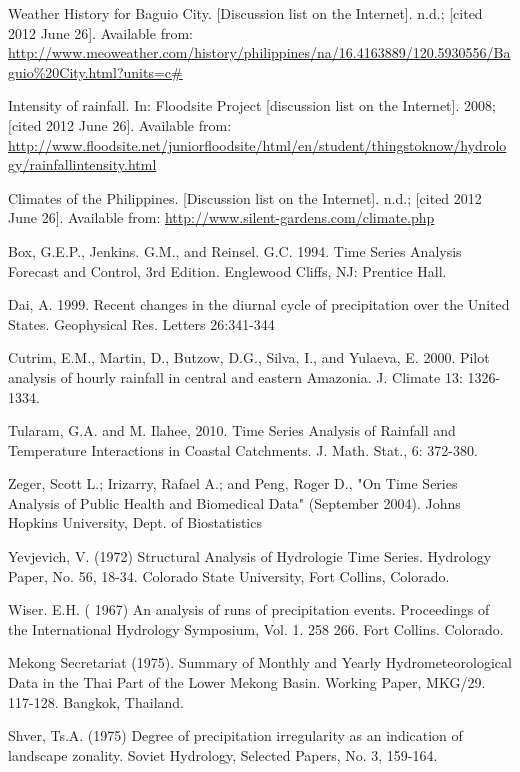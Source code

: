 \documentclass{pshscarc}\usepackage{graphicx, color}
\begin{document}
\begin{thebibliography}{99\kern\bibindent}
 Weather History for Baguio City. [Discussion list on the Internet]. n.d.; [cited 2012 June 26]. Available from: \url{http://www.meoweather.com/history/philippines/na/16.4163889/120.5930556/Baguio%20City.html?units=c#}

 Intensity of rainfall. In: Floodsite Project [discussion list on the Internet]. 2008; [cited 2012 June 26]. Available from: \url{http://www.floodsite.net/juniorfloodsite/html/en/student/thingstoknow/hydrology/rainfallintensity.html}

 Climates of the Philippines. [Discussion list on the Internet]. n.d.; [cited 2012 June 26]. Available from: \url{http://www.silent-gardens.com/climate.php}

 Box, G.E.P.,  Jenkins. G.M., and Reinsel. G.C.  1994. Time Series Analysis Forecast and Control, 3rd Edition. Englewood Cliffs, NJ: Prentice Hall.

 Dai, A. 1999. Recent changes in the diurnal cycle of precipitation over the United States. Geophysical Res. Letters 26:341-344

 Cutrim,  E.M., Martin, D., Butzow, D.G., Silva, I., and Yulaeva, E. 2000. Pilot analysis of hourly rainfall in central and eastern Amazonia. J. Climate 13: 1326-1334.

 Tularam, G.A. and M. Ilahee, 2010. Time Series Analysis of Rainfall and Temperature Interactions in Coastal Catchments. J. Math. Stat., 6: 372-380.

Zeger, Scott L.; Irizarry, Rafael A.; and Peng, Roger D., "On Time Series Analysis of Public Health and Biomedical Data" (September 2004). Johns Hopkins University, Dept. of Biostatistics 

Yevjevich, V. (1972) Structural Analysis of Hydrologie Time Series. Hydrology Paper, No. 56, 18-34. Colorado State University, Fort Collins, Colorado.

Wiser. E.H. ( 1967) An analysis of runs of precipitation events. Proceedings of the International Hydrology Symposium, Vol. 1. 258 266. Fort Collins. Colorado.

Mekong Secretariat (1975). Summary of Monthly and Yearly Hydrometeorological Data in the Thai Part of the Lower Mekong Basin. Working Paper, MKG/29. 117-128. Bangkok, Thailand.

Shver, Ts.A. (1975) Degree of precipitation irregularity as an indication of landscape zonality. Soviet Hydrology, Selected Papers, No. 3, 159-164.


\end{thebibliography}
\end{document}
